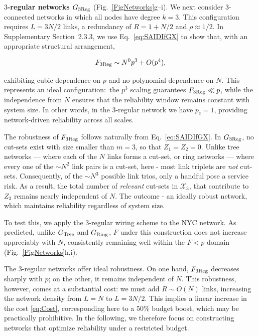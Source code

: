 \documentclass[oneside, a4paper, onecolumn, 11pt]{article}
\newcommand{\X}{\mathcal X}
\begin{document}
\begin{refsection}
\vspace{3mm}
\textbf{\color{blue} $3$-regular networks $G_{\rm 3Reg}$} (Fig.\ \ref{FigNetworks}g–i).
We next consider $3$-connected networks in which all nodes have degree $k = 3$. This configuration requires $L = 3N/2$ links, a redundancy of $R = 1 + N/2$ and $\rho \approx 1/2$. In Supplementary Section~2.3.3, we use Eq.\ \eqref{eq:SAIDIfGX} to show that, with an appropriate structural arrangement,

\begin{equation}
F_{3\rm Reg} \sim N^0 p^3 + O(p^4),
\label{F3Regular}
\end{equation}

exhibiting cubic dependence on $p$ and no polynomial dependence on $N$. This represents an ideal configuration:\ the $p^3$ scaling guarantees $F_{3\rm Reg} \ll p$, while the independence from $N$ ensures that the reliability window remains constant with system size. In other words, in the $3$-regular network we have $p_c = 1$, providing network-driven reliability across all scales.

The robustness of $F_{3 \rm Reg}$ follows naturally from Eq.\ \eqref{eq:SAIDIfGX}. In $G_{\rm 3Reg}$, no cut-sets exist with size smaller than $m = 3$, so that $Z_1 = Z_2 = 0$. Unlike tree networks — where each of the $N$ links forms a cut-set, or ring networks — where every one of the $\sim N^2$ link pairs is a cut-set, here - most link triplets are \textit{not} cut-sets. Consequently, of the $\sim N^3$ possible link trios, only a handful pose a service risk. As a result, the total number of \textit{relevant} cut-sets in $\X_3$, that contribute to $Z_3$ remains nearly independent of $N$. The outcome - an ideally robust network, which maintains reliability regardless of system size.

To test this, we apply the $3$-regular wiring scheme to the NYC network. As predicted, unlike $G_{\rm Tree}$ and $G_{\rm Ring}$, $F$ under this construction does not increase appreciably with $N$, consistently remaining well within the $F < p$ domain (Fig.\ \ref{FigNetworks}h,i).

The $3$-regular networks offer ideal robustness. On one hand, $F_{3\rm Reg}$ decreases sharply with $p$; on the other, it remains independent of $N$. This robustness, however, comes at a substantial cost: we must add $R \sim O(N)$ links, increasing the network density from $L = N$ to $L = 3N/2$. This implies a linear increase in the cost \eqref{eq:Cost}, corresponding here to a $50\%$ budget boost, which may be practically prohibitive. In the following, we therefore focus on constructing networks that optimize reliability under a restricted budget.



\end{refsection}
\end{document}
